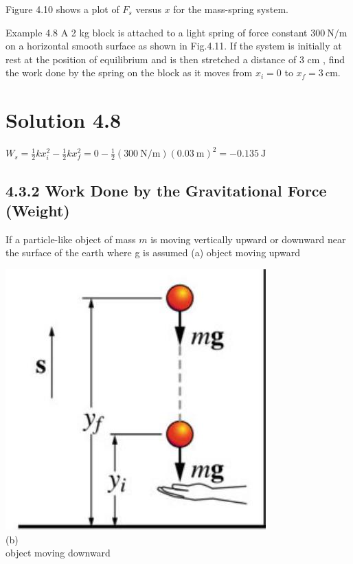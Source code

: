 \documentclass[10pt]{article}
\begin{document}
Figure 4.10 shows a plot of $F_{s}$ versus $x$ for the mass-spring system.

Example 4.8 A 2 kg block is attached to a light spring of force constant $300 \mathrm{~N} / \mathrm{m}$ on a horizontal smooth surface as shown in Fig.4.11. If the system is initially at rest at the position of equilibrium and is then stretched a distance of 3 cm , find the work done by the spring on the block as it moves from $x_{i}=0$ to $x_{f}=3 \mathrm{~cm}$.

\section*{Solution 4.8}
$W_{s}=\frac{1}{2} k x_{i}^{2}-\frac{1}{2} k x_{f}^{2}=0-\frac{1}{2}(300 \mathrm{~N} / \mathrm{m})(0.03 \mathrm{~m})^{2}=-0.135 \mathrm{~J}$

\subsection*{4.3.2 Work Done by the Gravitational Force (Weight)}
If a particle-like object of mass $m$ is moving vertically upward or downward near the surface of the earth where g is assumed (a) object moving upward

\includegraphics[max width=\textwidth, center]{2024_09_13_db1f357d2aad0a03eb2eg-067(1)}\\
(b)\\
object moving downward
\end{document}
